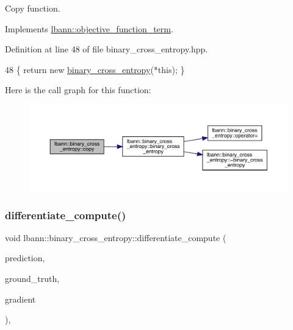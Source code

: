 Copy function. 

Implements \hyperlink{classlbann_1_1objective__function__term_ae98a4ec173a602ad55d1df20dadd4cb9}{lbann\+::objective\+\_\+function\+\_\+term}.



Definition at line 48 of file binary\+\_\+cross\+\_\+entropy.\+hpp.


\begin{DoxyCode}
48 \{ \textcolor{keywordflow}{return} \textcolor{keyword}{new} \hyperlink{classlbann_1_1binary__cross__entropy_ad142f09272d2572c34812dc6bbc54434}{binary\_cross\_entropy}(*\textcolor{keyword}{this}); \}
\end{DoxyCode}
Here is the call graph for this function\+:\nopagebreak
\begin{figure}[H]
\begin{center}
\leavevmode
\includegraphics[width=350pt]{classlbann_1_1binary__cross__entropy_a5183da69553c71cb3fffc765e95c623f_cgraph}
\end{center}
\end{figure}
\mbox{\label{classlbann_1_1binary__cross__entropy_aeb1d10100a565e1c92a4f75fb7f58829}} 
\subsubsection{\texorpdfstring{differentiate\+\_\+compute()}{differentiate\_compute()}}
{\footnotesize\ttfamily void lbann\+::binary\+\_\+cross\+\_\+entropy\+::differentiate\+\_\+compute (\begin{DoxyParamCaption}\item[{const \hyperlink{base_8hpp_a9a697a504ae84010e7439ffec862b470}{Abs\+Dist\+Mat} \&}]{prediction,  }\item[{const \hyperlink{base_8hpp_a9a697a504ae84010e7439ffec862b470}{Abs\+Dist\+Mat} \&}]{ground\+\_\+truth,  }\item[{\hyperlink{base_8hpp_a9a697a504ae84010e7439ffec862b470}{Abs\+Dist\+Mat} \&}]{gradient }\end{DoxyParamCaption})\hspace{0.3cm}{\ttfamily [override]}, {\ttfamily [virtual]}}

